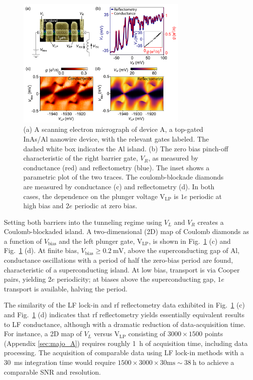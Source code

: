 \begin{figure}
	\includegraphics[width=0.75\textwidth]{Fig2-18.pdf}
	\caption[Conductance via lock-in versus lead reflectometry]{(a) A scanning electron micrograph of device A, a top-gated InAs/Al nanowire device, with the relevant gates labeled. The dashed white box indicates the Al island. (b) The zero bias pinch-off characteristic of the right barrier gate, $V_R$, as measured by conductance (red) and reflectometry (blue). The inset shows a parametric plot of the two traces. The coulomb-blockade diamonds are measured by conductance (c) and reflectometry (d). In both cases, the dependence on  the plunger voltage V$_\textrm{LP}$ is $1e$ periodic at high bias and $2e$ periodic at zero bias.}
	\label{fig:majo_b}
\end{figure}

Setting both barriers into the tunneling regime using $V_L$ and $V_R$ creates a Coulomb-blockaded island. A two-dimensional (2D) map of Coulomb diamonds as a function of $V_\textrm{bias}$ and the left plunger gate, V$_{\textrm{LP}}$, is shown in Fig.~\ref{fig:majo_b} (c) and Fig.~\ref{fig:majo_b} (d). At finite bias, $V_\textrm{bias} \geq \SI{0.2}{\milli\volt}$, above the superconducting gap of Al, conductance oscillations with a period of half the zero-bias period are found, characteristic of a superconducting island. At low bias, transport is via Cooper pairs, yielding $2e$ periodicity; at biases above the superconducting gap, $1e$ transport is available, halving the period.

The similarity of the LF lock-in and rf reflectometry data exhibited in Fig.~\ref{fig:majo_b} (c) and Fig.~\ref{fig:majo_b} (d) indicates that rf reflectometry yields essentially equivalent results to LF conductance, although with a dramatic reduction of data-acquisition time. For instance, a 2D map of $V_{L}$ versus V$_{\textrm{LP}}$ consisting of $3000 \times 1500$ points (Appendix \ref{sec:majo_A}) requires roughly \SI{1}{\hour} of acquisition time, including data processing. The acquisition of comparable data using LF lock-in methods with a \SI{30}{\milli\second} integration time would require $1500\times3000\times30 \si{\milli\second} \sim \SI{38}{\hour}$ to achieve a comparable SNR and resolution.

